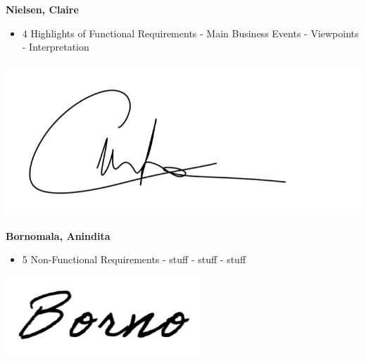 \documentclass[]{article}
\begin{document}
\textbf{Nielsen, Claire}
\begin{itemize}
        \item 4 Highlights of Functional Requirements
            \subitem - Main Business Events
            \subitem - Viewpoints
            \subitem - Interpretation
\end{itemize}
\includegraphics[scale=0.15]{clairesignature.jpg}

\textbf{Bornomala, Anindita}
\begin{itemize}
        \item 5 Non-Functional Requirements
            \subitem - stuff
            \subitem - stuff
            \subitem - stuff
\end{itemize}
\includegraphics[scale=0.50]{bornosignature.png}


\end{document}
